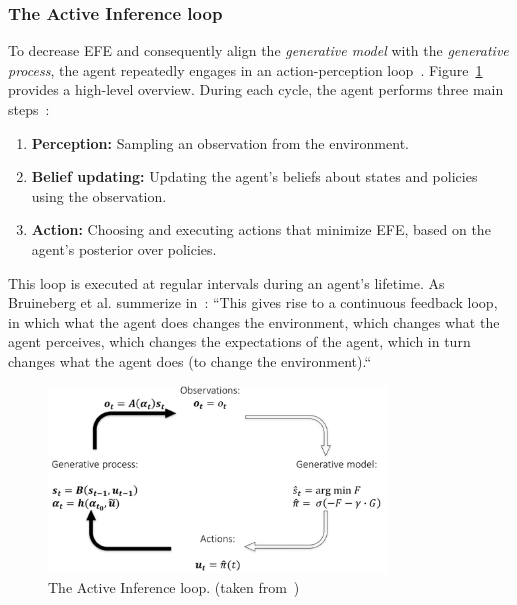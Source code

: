 \subsubsection{The Active Inference loop}
\label{sec:active-inference-loop}
To decrease EFE and consequently align the \textit{generative model} with the \textit{generative process}, the agent repeatedly engages in an action-perception loop~\cite{sedlak_equilibrium_2024}. Figure~\ref{fig:acive-inference-loop} provides a high-level overview. During each cycle, the agent performs three main steps~\cite{heins_pymdp_2022}:
\begin{enumerate}
    \item \textbf{Perception:} Sampling an observation from the environment.
    \item \textbf{Belief updating:} Updating the agent’s beliefs about states and policies using the
observation.
    \item \textbf{Action:} Choosing and executing actions that minimize EFE, based on the agent’s posterior over policies.
\end{enumerate}

This loop is executed at regular intervals during an agent's lifetime. As Bruineberg et al. summerize in~\cite{bruineberg_free-energy_2018}: ``This gives rise to a continuous feedback loop, in which what the agent does changes the environment, which changes what the agent perceives, which changes the expectations of the agent, which in turn changes what the agent does (to change the environment).``

\begin{figure}[htbp]
    \centering
    \includegraphics[width=0.8\textwidth]{img/active-inference-loop.png}
    \caption{The Active Inference loop. (taken from~\cite{bruineberg_free-energy_2018})}
    \label{fig:acive-inference-loop}
\end{figure}

